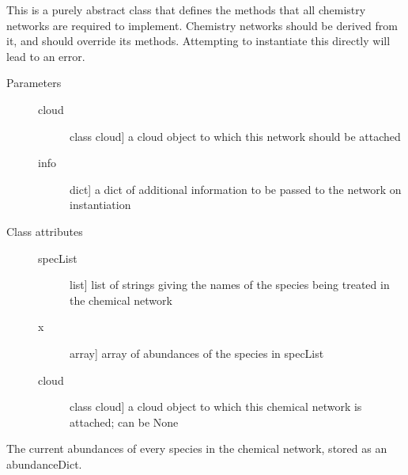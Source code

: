 \documentclass[letterpaper,10pt,english]{sphinxmanual}
\begin{document}
\begin{fulllineitems}
\label{fulldoc:despotic.chemistry.chemNetwork}
This is a purely abstract class that defines the methods that all
chemistry networks are required to implement. Chemistry networks
should be derived from it, and should override its
methods. Attempting to instantiate this directly will lead to an
error.
\begin{description}
\item[{Parameters}] \leavevmode\begin{description}
\item[{cloud}] \leavevmode{[}class cloud{]}
a cloud object to which this network should be attached

\item[{info}] \leavevmode{[}dict{]}
a dict of additional information to be passed to the network
on instantiation

\end{description}

\item[{Class attributes}] \leavevmode\begin{description}
\item[{specList}] \leavevmode{[}list{]}
list of strings giving the names of the species being
treated in the chemical network

\item[{x}] \leavevmode{[}array{]}
array of abundances of the species in specList

\item[{cloud}] \leavevmode{[}class cloud{]}
a cloud object to which this chemical network is attached;
can be None

\end{description}

\end{description}

\begin{fulllineitems}
\label{fulldoc:despotic.chemistry.chemNetwork.abundances}
The current abundances of every species in the chemical
network, stored as an abundanceDict.

\end{fulllineitems}



\end{fulllineitems}
\end{document}
